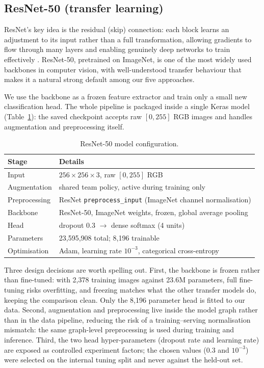 \documentclass[11pt,twoside,a4paper]{article}
\begin{document}
\subsection{ResNet-50 (transfer learning)}
ResNet's key idea is the residual (skip) connection: each block learns an
adjustment to its input rather than a full transformation, allowing gradients
to flow through many layers and enabling genuinely deep networks to train
effectively \cite{He2016}. ResNet-50, pretrained on ImageNet, is one of the
most widely used backbones in computer vision, with well-understood transfer
behaviour that makes it a natural strong default among our five approaches.

We use the backbone as a frozen feature extractor and train only a small new
classification head. The whole pipeline is packaged inside a single Keras
model (Table~\ref{tab:resnet50-config}): the saved checkpoint accepts raw
$[0, 255]$ RGB images and handles augmentation and preprocessing itself.

\begin{table}[H]
\centering
\caption{ResNet-50 model configuration.}
\label{tab:resnet50-config}
\small
\begin{tabular}{ll}
\toprule
Stage & Details \\
\midrule
Input & $256 \times 256 \times 3$, raw $[0,255]$ RGB \\
Augmentation & shared team policy, active during training only \\
Preprocessing & ResNet \texttt{preprocess\_input} (ImageNet channel normalisation) \\
Backbone & ResNet-50, ImageNet weights, frozen, global average pooling \\
Head & dropout 0.3 $\rightarrow$ dense softmax (4 units) \\
Parameters & 23{,}595{,}908 total; 8{,}196 trainable \\
Optimisation & Adam, learning rate $10^{-3}$, categorical cross-entropy \\
\bottomrule
\end{tabular}
\end{table}
Three design decisions are worth spelling out. First, the backbone is frozen rather than fine-tuned: with 2,378 training images against 23.6M parameters, full fine-tuning risks overfitting, and freezing matches what the other transfer models do, keeping the comparison clean. Only the 8,196 parameter head is fitted to our data. Second, augmentation and preprocessing live inside the model graph rather than in the data
pipeline, reducing the risk of a training--serving normalisation mismatch: the
same graph-level preprocessing is used during training and inference.
Third, the two head hyper-parameters (dropout rate and learning rate) are
exposed as controlled experiment factors; the chosen values (0.3 and
$10^{-3}$) were selected on the internal tuning split and never against the
held-out set.
\end{document}
